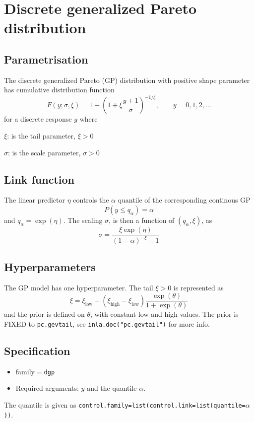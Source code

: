 \documentclass[12pt]{article}
\begin{document}
\section*{Discrete generalized Pareto distribution}
\subsection*{Parametrisation}
The discrete generalized Pareto (GP) distribution with positive shape parameter
has cumulative distribution function
$$
F(y;\sigma,\xi)=1-\left(1+\xi\frac{y+1}{\sigma}\right)^{-1/\xi},
\qquad y = 0, 1, 2, \ldots
$$
for a discrete response $y$ where
\begin{description}
\item $\xi$: is the tail parameter, $\xi>0$
\item $\sigma$: is the scale parameter, $\sigma>0$
\end{description}

\subsection*{Link function}

The linear predictor $\eta$ controls the $\alpha$ quantile of
the corresponding continous GP
\begin{displaymath}
    P(y \le q_{\alpha}) = \alpha
\end{displaymath}
and $q_{\alpha} = \exp(\eta)$. The scaling $\sigma$, is then a
function of $(q_{\alpha}, \xi)$, as
\begin{displaymath}
    \sigma = \frac{\xi\exp(\eta)}{(1-\alpha)^{-\xi}-1}
\end{displaymath}

\subsection*{Hyperparameters}
The $\mathrm{GP}$ model has one hyperparameter. The tail $\xi>0$ is
represented as
$$
\xi = \xi_{\text{low}} + (\xi_{\text{high}} - \xi_{\text{low}})
\frac{\exp(\theta)}{1 + \exp(\theta)}
$$
and the prior is defined on $\theta$, with constant low and high
values. The prior is FIXED to \texttt{pc.gevtail}, see
\texttt{inla.doc("pc.gevtail")} for more info.

\subsection*{Specification}
\begin{itemize}
\item family$=$\texttt{dgp}
\item Required arguments: $y$ and the quantile $\alpha$. 
\end{itemize}
The quantile is given as \texttt{control.family=list(control.link=list(quantile=$\alpha$))}.
\end{document}
